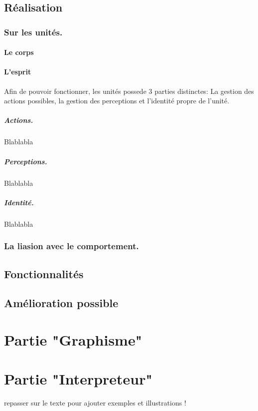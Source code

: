 \documentclass{report}
\begin{document}
\section{Réalisation}
\subsection{Sur les unités.}

\subsubsection{Le corps}
\subsubsection{L'esprit}
Afin de pouvoir fonctionner, les unités possede 3 parties distinctes: La gestion des actions possibles, la gestion des perceptions et l'identité propre de l'unité.
\paragraph{Actions.}
Blablabla
\paragraph{Perceptions.}
Blablabla
\paragraph{Identité.}
Blablabla

\subsection{La liasion avec le comportement.}
\section{Fonctionnalités}
\section{Amélioration possible}

\newpage
\chapter{Partie "Graphisme"}

\newpage
\chapter{Partie "Interpreteur"}
repasser sur le texte pour ajouter exemples et illustrations ! 
\end{document}
